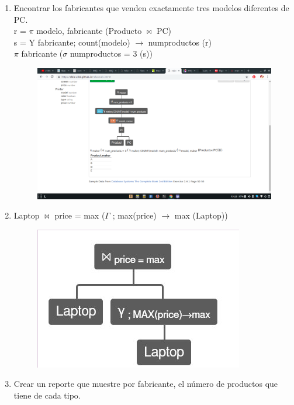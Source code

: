 \documentclass[a4paper, 12pt]{report}
\begin{document}
{\begin{enumerate}[label=\alph*)]
{}
\item{Encontrar los fabricantes que venden exactamente tres modelos
	diferentes de PC.\\
	r = $\pi$ modelo, fabricante (Producto $\Join$ PC)\\
    s = Y fabricante; count(modelo) $\rightarrow$ numproductos (r)\\
    $\pi$ fabricante ($\sigma$ numproductos = 3 (s))\\
    \begin{figure}[H]
        \includegraphics[width=\textwidth]
            {img/l.png}\hfill
    \end{figure}
}
\item{Laptop $\Join$ price = max ($\Gamma$ ; max(price) $\rightarrow$ max (Laptop))\\
    \begin{figure}[H]
        \includegraphics[width=\textwidth]
            {img/m.png}\hfill
    \end{figure}
}
\item{Crear un reporte que muestre por fabricante, el número de productos que tiene de cada tipo.\\
}
\end{enumerate}}
\end{document}
